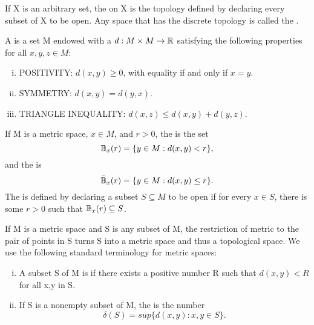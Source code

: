 \documentclass[11pt,a4paper]{article}
\begin{document}
\begin{example}
    If X is an arbitrary set, the  on X is the topology defined by declaring every subset of X to be open. Any space that has the discrete topology is called the .
\end{example}

\begin{example}\label{ex:metric_topology}
    A  is a set M endowed with a  $d:M\times M\rightarrow \mathbb{R}$ satisfying the following properties for all $x,y,z\in M$:
    \begin{enumerate}[(i)]
        \item POSITIVITY: $d(x,y)\ge 0$, with equality if and only if $x=y$.
        \item SYMMETRY: $d(x,y)=d(y,x)$.
        \item TRIANGLE INEQUALITY: $d(x,z)\le d(x,y)+d(y,z)$.
    \end{enumerate}
    If M is a metric space, $x\in M$, and $r>0$, the  is the set
    \begin{equation*}
        \mathbb{B}_x(r) = \{y\in M: d(x,y)<r\},
    \end{equation*}
    and the  is
    \begin{equation*}
        \bar{\mathbb{B}}_x(r)=\{y\in M: d(x,y)\le r\}.
    \end{equation*}
    The  is defined by declaring a subset $S\subseteq M$ to be open if for every $x\in S$, there is some $r>0$ such that $\mathbb{B}_x(r)\subseteq S$.

    If M is a metric space and S is any subset of M, the restriction of metric to the pair of points in S turns S into a metric space and thus a topological space. We use the following standard terminology for metric spaces:
    \begin{enumerate}[(i)]
        \item A subset S of M is  if there exists a positive number R such that $d(x,y)<R$ for all x,y in S.
        \item If S is a nonempty subset of M, the  is the number 
        \begin{equation*}
            \delta(S) = sup\{d(x,y):x,y\in S\}.    
        \end{equation*}
    \end{enumerate}
\end{example}
\end{document}
